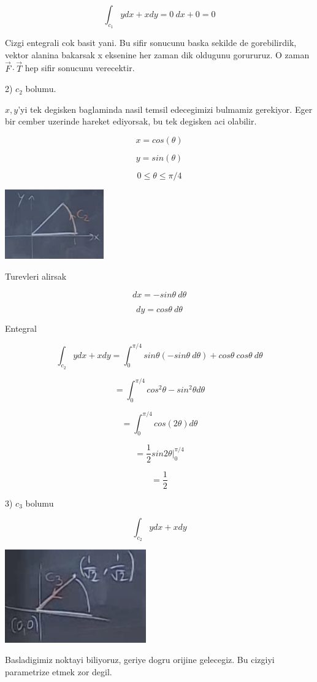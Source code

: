\documentclass[12pt,fleqn]{article}\usepackage{../common}
\begin{document}
\[ \int_{c_1} y dx + x dy = 0 \ dx + 0 = 0\]

Cizgi entegrali cok basit yani. Bu sifir sonucunu baska sekilde de
gorebilirdik, vektor alanina bakarsak x eksenine her zaman dik oldugunu
gorururuz. O zaman $\vec{F}\cdot \vec{T}$ hep sifir sonucunu verecektir. 

2) $c_2$ bolumu. 

$x,y$'yi tek degisken baglaminda nasil temsil edecegimizi bulmamiz
gerekiyor. Eger bir cember uzerinde hareket ediyorsak, bu tek degisken aci
olabilir. 

\[ x = cos(\theta) \]

\[ y = sin(\theta) \]

\[ 0 \le \theta \le \pi / 4 \]

\includegraphics[height=3cm]{20_3.png}

Turevleri alirsak

\[ dx = -sin\theta \ d\theta\]

\[ dy = cos\theta \ d\theta \]

Entegral

\[ \int_{c_2} y dx + x dy = 
\int_0^{\pi/4} sin\theta (-sin\theta \ d\theta)  + 
cos\theta \ cos\theta \ d\theta
\]

\[ = \int_0^{\pi/4} cos^2\theta - sin^2\theta d\theta \]

\[ = \int_0^{\pi/4} cos(2\theta) d\theta \]

\[ = \frac{1}{2}sin2\theta \bigg|_0^{\pi/4} \]

\[ = \frac{1}{2} \]

3) $c_3$ bolumu

\[ \int_{c_2} y dx + x dy \]

\includegraphics[height=4cm]{20_4.png}

Basladigimiz noktayi biliyoruz, geriye dogru orijine gelecegiz. Bu cizgiyi
parametrize etmek zor degil. 
\end{document}
